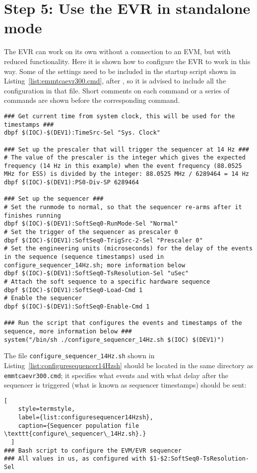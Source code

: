 \documentclass[11pt
  , a4paper
  , article
  , oneside
  , showtrims
]{memoir}
\begin{document}
{\section{Step 5: Use the EVR in standalone mode}
The EVR can work on its own without a connection to an EVM, but with reduced functionality. Here it is shown how to configure the EVR to work in this way. Some of the settings need to be included in the startup script shown in Listing~\ref{list:emmtcaevr300.cmd}, after , so it is advised to include all the configuration in that file. Short comments on each command or a series of commands are shown before the corresponding command.
\begin{lstlisting}[style=termstyle]
### Get current time from system clock, this will be used for the timestamps ###
dbpf $(IOC)-$(DEV1):TimeSrc-Sel "Sys. Clock"

### Set up the prescaler that will trigger the sequencer at 14 Hz ###
# The value of the prescaler is the integer which gives the expected frequency (14 Hz in this example) when the event frequency (88.0525 MHz for ESS) is divided by the integer: 88.0525 MHz / 6289464 = 14 Hz
dbpf $(IOC)-$(DEV1):PS0-Div-SP 6289464

### Set up the sequencer ###
# Set the runmode to normal, so that the sequencer re-arms after it finishes running
dbpf $(IOC)-$(DEV1):SoftSeq0-RunMode-Sel "Normal"
# Set the trigger of the sequencer as prescaler 0
dbpf $(IOC)-$(DEV1):SoftSeq0-TrigSrc-2-Sel "Prescaler 0"
# Set the engineering units (microseconds) for the delay of the events in the sequence (sequence timestamps) used in configure_sequencer_14Hz.sh; more information below
dbpf $(IOC)-$(DEV1):SoftSeq0-TsResolution-Sel "uSec"
# Attach the soft sequence to a specific hardware sequence
dbpf $(IOC)-$(DEV1):SoftSeq0-Load-Cmd 1
# Enable the sequencer
dbpf $(IOC)-$(DEV1):SoftSeq0-Enable-Cmd 1

### Run the script that configures the events and timestamps of the sequence, more information below ###
system("/bin/sh ./configure_sequencer_14Hz.sh $(IOC) $(DEV1)")
\end{lstlisting}

The file \texttt{configure\_sequencer\_14Hz.sh} shown in Listing~\ref{list:configuresequencer14Hzsh} should be located in the same directory as \texttt{emmtcaevr300.cmd}; it specifies what events and with what delay after the sequencer is triggered (what is known as sequencer timestamps) should be sent:
\begin{lstlisting}[
    style=termstyle,
    label={list:configuresequencer14Hzsh},
    caption={Sequencer population file \texttt{configure\_sequencer\_14Hz.sh}.}
  ]
### Bash script to configure the EVM/EVR sequencer
### All values in us, as configured with $1-$2:SoftSeq0-TsResolution-Sel


\end{lstlisting}}
\end{document}
